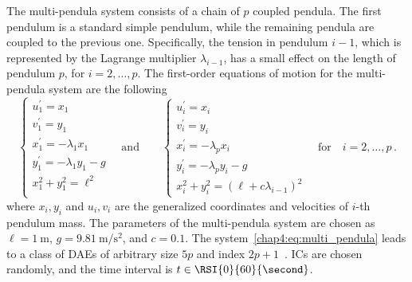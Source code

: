 The multi-pendula system consists of a chain of $p$ coupled pendula. The first pendulum is a standard simple pendulum, while the remaining pendula are coupled to the previous one. Specifically, the tension in pendulum $i - 1$, which is represented by the Lagrange multiplier $\lambda_{i-1}$, has a small effect on the length of
pendulum $p$, for $i = 2, \dots, p$. The first-order equations of motion for the multi-pendula system are the following~\cite{nedialkov2008solvingIII}
%
\begin{equation}
  \begin{cases}
    u_1^{\prime} = x_1 \\
    v_1^{\prime} = y_1 \\
    x_1^{\prime} = -\lambda_1 x_1 \\
    y_1^{\prime} = -\lambda_1 y_1 - g \\
    x_1^2 + y_1^2 = \ell^2 \\
  \end{cases}
  \quad \text{and} \qquad
  \begin{cases}
    u_i^{\prime} = x_i \\
    v_i^{\prime} = y_i \\
    x_i^{\prime} = -\lambda_p x_i \\
    y_i^{\prime} = -\lambda_p y_i - g \\
    x_i^2 + y_i^2 = (\ell + c\lambda_{i-1})^2
  \end{cases}
  \quad \text{for} \quad i = 2, \dots, p \, \text{.}
  \label{chap4:eq:multi_pendula}
\end{equation}
%
where $x_i, y_i$ and $u_i, v_i$ are the generalized coordinates and velocities of $i$-th pendulum mass. The parameters of the multi-pendula system are chosen as $\ell = \SI{1}{\meter}$, $g = \SI{9.81}{\meter\per\second\squared}$, and $c = 0.1$. The system~\eqref{chap4:eq:multi_pendula} leads to a class of \acp{DAE} of arbitrary size $5p$ and index $2p+1$~\cite{nedialkov2008solvingIII}. \acp{IC} are chosen randomly, and the time interval is $t \in \RSI{0}{60}{\second}$.

